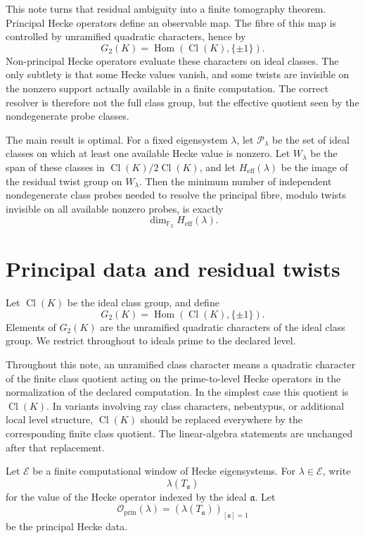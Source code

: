 \documentclass[11pt]{article}
\DeclareMathOperator{\Hom}{Hom}
\DeclareMathOperator{\Cl}{Cl}
\begin{document}
This note turns that residual ambiguity into a finite tomography theorem.  Principal Hecke operators define an observable map.  The fibre of this map is controlled by unramified quadratic characters, hence by
\[
G_2(K)=\Hom(\Cl(K),\{\pm1\}).
\]
Non-principal Hecke operators evaluate these characters on ideal classes.  The only subtlety is that some Hecke values vanish, and some twists are invisible on the nonzero support actually available in a finite computation.  The correct resolver is therefore not the full class group, but the effective quotient seen by the nondegenerate probe classes.

The main result is optimal.  For a fixed eigensystem \(\lambda\), let \(\mathcal P_\lambda\) be the set of ideal classes on which at least one available Hecke value is nonzero.  Let \(W_\lambda\) be the span of these classes in \(\Cl(K)/2\Cl(K)\), and let \(H_{\mathrm{eff}}(\lambda)\) be the image of the residual twist group on \(W_\lambda\).  Then the minimum number of independent nondegenerate class probes needed to resolve the principal fibre, modulo twists invisible on all available nonzero probes, is exactly
\[
\dim_{\mathbb F_2} H_{\mathrm{eff}}(\lambda).
\]

\section{Principal data and residual twists}

Let \(\Cl(K)\) be the ideal class group, and define
\[
G_2(K)=\Hom(\Cl(K),\{\pm1\}).
\]
Elements of \(G_2(K)\) are the unramified quadratic characters of the ideal class group.  We restrict throughout to ideals prime to the declared level.

Throughout this note, an unramified class character means a quadratic character of the finite class quotient acting on the prime-to-level Hecke operators in the normalization of the declared computation.  In the simplest case this quotient is \(\Cl(K)\).  In variants involving ray class characters, nebentypus, or additional local level structure, \(\Cl(K)\) should be replaced everywhere by the corresponding finite class quotient.  The linear-algebra statements are unchanged after that replacement.

Let \(\mathcal E\) be a finite computational window of Hecke eigensystems.  For \(\lambda\in\mathcal E\), write
\[
\lambda(T_{\mathfrak a})
\]
for the value of the Hecke operator indexed by the ideal \(\mathfrak a\).  Let
\[
\mathcal O_{\mathrm{prin}}(\lambda)=
(\lambda(T_{\mathfrak a}))_{[\mathfrak a]=1}
\]
be the principal Hecke data.
\end{document}
